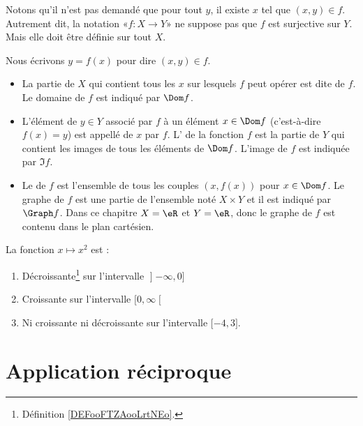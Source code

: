 \begin{normaltext}
	Notons qu'il n'est pas demandé que pour tout \( y\), il existe \( x\) tel que \( (x,y)\in f\). Autrement dit, la notation «\( f\colon X\to Y\)» ne suppose pas que \( f\) est surjective sur \( Y\). Mais elle doit être définie sur tout \( X\).

	Nous écrivons \( y=f(x)\) pour dire \( (x,y)\in f\).
	\begin{itemize}
		\item La partie de \( X\) qui contient tous les \( x\) sur lesquels \( f\) peut opérer est dite  de \( f\). Le domaine de \( f\) est indiqué par \( \Dom f\).
		\item L'élément de \( y\in Y\) associé par \( f\) à un élément \( x\in \Dom f\) (c'est-à-dire \( f(x) = y\))  est appellé  de \( x\) par \( f\). L' de la fonction \( f\) est la partie de \( Y\) qui contient les images de tous les éléments de \( \Dom f\). L'image de \( f\) est indiquée par \( \Im f\).
		\item Le  de \( f\) est l'ensemble de tous les couples \( (x, f(x))\) pour \( x\in \Dom f\). Le graphe de \( f\) est une partie de l'ensemble noté \( X\times Y\) et il est indiqué par \( \Graph f\). Dans ce chapitre \( X = \eR\) et \( Y = \eR\), donc le graphe de \( f\) est contenu dans le plan cartésien.
	\end{itemize}

\end{normaltext}


\begin{proposition}	\label{PROPooVLHWooKiAQTr}
	La fonction \( x\mapsto x^2\) est :
	\begin{enumerate}
		\item
		      Décroissante\footnote{Définition \ref{DEFooFTZAooLrtNEo}.} sur l'intervalle \( \mathopen] -\infty , 0 \mathclose]\)
		\item
		      Croissante sur l'intervalle \( \mathopen[ 0 , \infty \mathclose[\)
		\item
		      Ni croissante ni décroissante sur l'intervalle \( \mathopen[ -4 , 3 \mathclose]\).
	\end{enumerate}
\end{proposition}


\section{Application réciproque}

